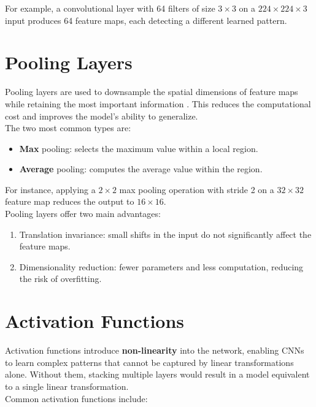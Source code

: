 For example, a convolutional layer with 64 filters of size $3 \times 3$ on a $224 \times 224 \times 3$ input produces 64 feature maps, each detecting a different learned pattern.

\section{Pooling Layers}

Pooling layers are used to downsample the spatial dimensions of feature maps while retaining the most important information \cite{goodfellow2016deep}.
This reduces the computational cost and improves the model’s ability to generalize.
\\
The two most common types are:

\begin{itemize}
    \item \textbf{Max} pooling: selects the maximum value within a local region.
    \item \textbf{Average} pooling: computes the average value within the region.
\end{itemize}

For instance, applying a $2 \times 2$ max pooling operation with stride 2 on a $32 \times 32$ feature map reduces the output to $16 \times 16$.
\\
Pooling layers offer two main advantages:
\begin{enumerate}
    \item Translation invariance: small shifts in the input do not significantly affect the feature maps.
    \item Dimensionality reduction: fewer parameters and less computation, reducing the risk of overfitting.
\end{enumerate}

\section{Activation Functions}

Activation functions introduce \textbf{non-linearity} into the network, enabling CNNs to learn complex patterns that cannot be captured by linear transformations alone.
Without them, stacking multiple layers would result in a model equivalent to a single linear transformation.
\\
Common activation functions include:

